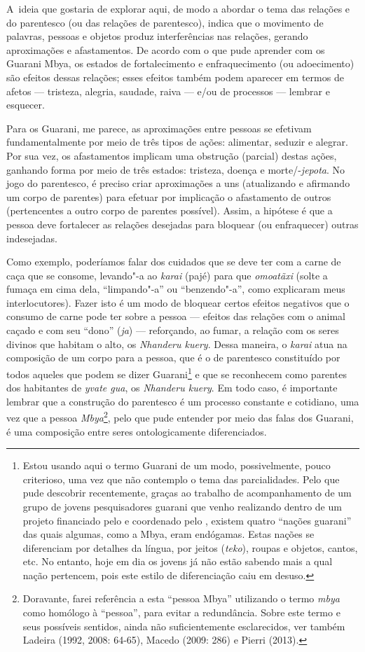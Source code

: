 A~ideia que gostaria de explorar aqui, de modo a abordar o tema das
relações e do parentesco (ou das relações de parentesco), indica que o
movimento de palavras, pessoas e objetos produz interferências nas
relações, gerando aproximações e afastamentos. De acordo com o que pude
aprender com os Guarani Mbya, os estados de fortalecimento e
enfraquecimento (ou adoecimento) são efeitos dessas relações; esses
efeitos também podem aparecer em termos de afetos --- tristeza, alegria,
saudade, raiva --- e/ou de processos --- lembrar e esquecer.

Para os Guarani, me parece, as aproximações entre pessoas se efetivam
fundamentalmente por meio de três tipos de ações: alimentar, seduzir e
alegrar. Por sua vez, os afastamentos implicam uma obstrução (parcial)
destas ações, ganhando forma por meio de três estados: tristeza, doença
e morte/-\emph{jepota}. No jogo do parentesco, é preciso criar aproximações a
uns (atualizando e afirmando um corpo de parentes) para efetuar por
implicação o afastamento de outros (pertencentes a outro corpo de
parentes possível). Assim, a hipótese é que a pessoa deve fortalecer as
relações desejadas para bloquear (ou enfraquecer) outras indesejadas.

Como exemplo, poderíamos falar dos cuidados que se deve ter com a carne
de caça que se consome, levando"-a ao \emph{karai} (pajé) para que \emph{omoatãxi}
(solte a fumaça em cima dela, ``limpando"-a'' ou ``benzendo"-a'', como
explicaram meus interlocutores). Fazer isto é um modo de bloquear
certos efeitos negativos que o consumo de carne pode ter sobre a pessoa
--- efeitos das relações com o animal caçado e com seu ``dono'' (\emph{ja}) ---
reforçando, ao fumar, a relação com os seres divinos que habitam o
alto, os \emph{Nhanderu kuery}. Dessa maneira, o \emph{karai} atua na composição de
um corpo para a pessoa, que é o de parentesco constituído por todos
aqueles que podem se dizer Guarani\footnote{Estou usando aqui o termo
Guarani de um modo, possivelmente, pouco criterioso, uma vez que não
contemplo o tema das parcialidades. Pelo que pude descobrir
recentemente, graças ao trabalho de acompanhamento de um grupo de
jovens pesquisadores guarani que venho realizando dentro de um projeto
financiado pelo  e coordenado pelo , existem quatro ``nações
guarani'' das quais algumas, como a Mbya, eram endógamas. Estas nações
se diferenciam por detalhes da língua, por jeitos (\emph{teko}), roupas e
objetos, cantos, etc. No entanto, hoje em dia os jovens já não estão
sabendo mais a qual nação pertencem, pois este estilo de diferenciação
caiu em desuso.} e que se reconhecem como parentes dos habitantes de
\emph{yvate gua}, os \emph{Nhanderu kuery}. Em todo caso, é importante lembrar que a
construção do parentesco é um processo constante e cotidiano, uma vez
que a pessoa \emph{Mbya}\footnote{Doravante, farei referência a esta ``pessoa
Mbya'' utilizando o termo \emph{mbya} como homólogo à ``pessoa'', para evitar a
redundância. Sobre este termo e seus possíveis sentidos, ainda não
suficientemente esclarecidos, ver também Ladeira (1992, 2008: 64-65),
Macedo (2009: 286) e Pierri (2013).}, pelo que pude entender por meio
das falas dos Guarani, é uma composição entre seres ontologicamente
diferenciados.

